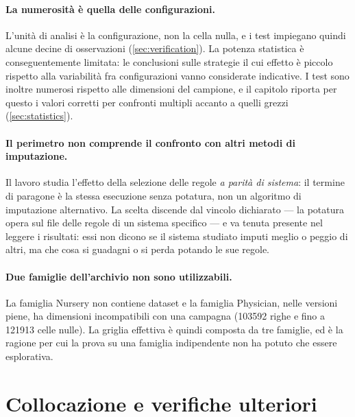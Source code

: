 \paragraph{La numerosità è quella delle configurazioni.} L'unità di analisi è la configurazione,
non la cella nulla, e i test impiegano quindi alcune decine di osservazioni
(\autoref{sec:verification}). La potenza statistica è conseguentemente limitata: le conclusioni
sulle strategie il cui effetto è piccolo rispetto alla variabilità fra configurazioni vanno
considerate indicative. I test sono inoltre numerosi rispetto alle dimensioni del campione, e il
capitolo riporta per questo i valori corretti per confronti multipli accanto a quelli grezzi
(\autoref{sec:statistics}).

\paragraph{Il perimetro non comprende il confronto con altri metodi di imputazione.} Il lavoro
studia l'effetto della selezione delle regole \emph{a parità di sistema}: il termine di paragone è
la stessa esecuzione senza potatura, non un algoritmo di imputazione alternativo. La scelta
discende dal vincolo dichiarato --- la potatura opera sul file delle regole di un sistema
specifico --- e va tenuta presente nel leggere i risultati: essi non dicono se il sistema studiato
imputi meglio o peggio di altri, ma che cosa si guadagni o si perda potando le sue regole.

\paragraph{Due famiglie dell'archivio non sono utilizzabili.} La famiglia Nursery non contiene
dataset e la famiglia Physician, nelle versioni piene, ha dimensioni incompatibili con una
campagna (\num{103592} righe e fino a \num{121913} celle nulle). La griglia effettiva è quindi
composta da tre famiglie, ed è la ragione per cui la prova su una famiglia indipendente non ha
potuto che essere esplorativa.

\section{Collocazione e verifiche ulteriori}\label{sec:positioning}

